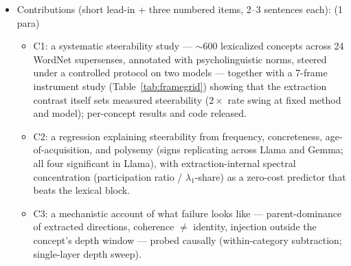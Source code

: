 \documentclass[11pt]{article}
\newenvironment{outline}{\color{gray!70!black}\begin{itemize}[leftmargin=1.2em,itemsep=1pt]}{\end{itemize}\color{black}}
\begin{document}
\begin{outline}
\item Contributions (short lead-in + three numbered items, 2--3 sentences each): (1 para)
  \begin{itemize}
  \item C1: a systematic steerability study --- $\sim$600 lexicalized concepts across 24 WordNet supersenses, annotated with psycholinguistic norms, steered under a controlled protocol on two models --- together with a 7-frame instrument study (Table~\ref{tab:framegrid}) showing that the extraction contrast itself sets measured steerability ($2\times$ rate swing at fixed method and model); per-concept results and code released.
  \item C2: a regression explaining steerability from frequency, concreteness, age-of-acquisition, and polysemy (signs replicating across Llama and Gemma; all four significant in Llama), with extraction-internal spectral concentration (participation ratio / $\lambda_1$-share) as a zero-cost predictor that beats the lexical block.
  \item C3: a mechanistic account of what failure looks like --- parent-dominance of extracted directions, coherence $\neq$ identity, injection outside the concept's depth window --- probed causally (within-category subtraction; single-layer depth sweep).
  \end{itemize}
\end{outline}
\end{document}
